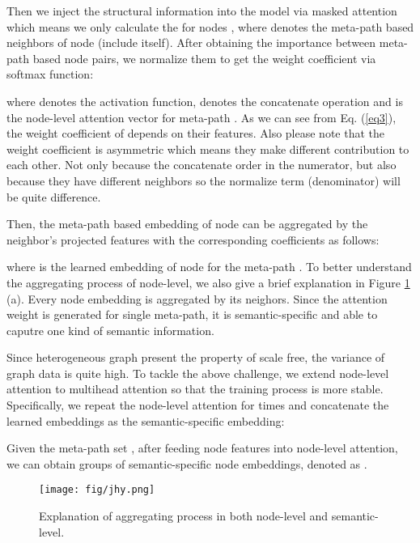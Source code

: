 Then we inject the structural information into the model via
masked attention
which means we only calculate the  for nodes , where  denotes the meta-path based neighbors of node  (include itself). After obtaining the importance between meta-path based node pairs, we normalize them to get the weight coefficient  
via softmax function:

where  denotes the activation function,  denotes the concatenate operation and 
 is the node-level attention vector for meta-path . As we can see from Eq. (\ref{eq3}), the weight coefficient of  depends on their features. Also please note that the weight coefficient  is asymmetric which means they make different contribution to each other. Not only because the concatenate order in the numerator, but also because they have different neighbors so the normalize term (denominator) will be quite difference.

Then, the meta-path based embedding of node  can be aggregated by the neighbor's projected features with the corresponding coefficients as follows:


where  is the learned embedding of node  for the meta-path . 
To better understand the aggregating process of node-level, we also give a brief explanation in Figure \ref{fig_explain} (a). Every node embedding is aggregated by its neighors.
Since the attention weight  is generated for single meta-path, it is semantic-specific and able to caputre one kind of semantic information.


Since heterogeneous graph present the property of scale free,
the variance of graph data is quite high.
To tackle the above challenge,
we extend node-level attention to multihead attention so that the training process is more stable. Specifically, we repeat the node-level attention for  times 
and concatenate the learned embeddings as the semantic-specific embedding:

Given the meta-path set  , after feeding node features into node-level attention, 
we can obtain  groups of semantic-specific node embeddings, 
denoted as .


\begin{figure}
	\centering
\texttt{[image: fig/jhy.png]}
	
	\caption{Explanation of aggregating process in both node-level and semantic-level.}
	\label{fig_explain}
\end{figure}




